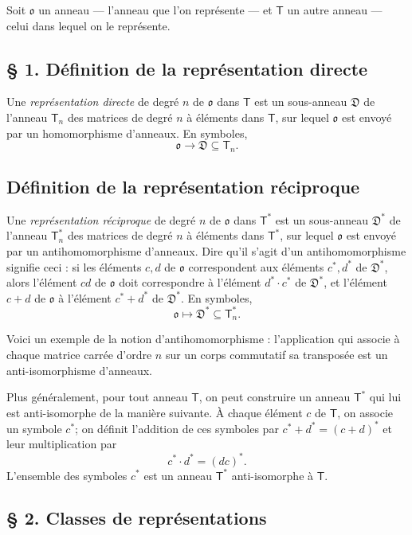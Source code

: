 Soit $\mathfrak{o}$ un anneau --- l'anneau que l'on représente --- et $\mathsf T$ un autre anneau --- celui dans lequel on le représente.

\subsection*{\S{} 1. Définition de la représentation directe}\label{fr-r823-definition-representation-directe}

Une \emph{représentation directe} de degré $n$ de $\mathfrak{o}$ dans $\mathsf T$ est un sous-anneau $\mathfrak D$ de l'anneau $\mathsf T_n$ des matrices de degré $n$ à éléments dans $\mathsf T$, sur lequel $\mathfrak{o}$ est envoyé par un homomorphisme d'anneaux. En symboles,
\[
\mathfrak{o}\to\mathfrak D\subseteq\mathsf T_n.
\]

\subsection*{Définition de la représentation réciproque}\label{fr-r823-definition-representation-reciproque}

Une \emph{représentation réciproque} de degré $n$ de $\mathfrak{o}$ dans $\mathsf T^*$ est un sous-anneau $\mathfrak D^*$ de l'anneau $\mathsf T_n^*$ des matrices de degré $n$ à éléments dans $\mathsf T^*$, sur lequel $\mathfrak{o}$ est envoyé par un antihomomorphisme d'anneaux. Dire qu'il s'agit d'un antihomomorphisme signifie ceci : si les éléments $c,d$ de $\mathfrak{o}$ correspondent aux éléments $c^*,d^*$ de $\mathfrak D^*$, alors l'élément $cd$ de $\mathfrak{o}$ doit correspondre à l'élément $d^*\cdot c^*$ de $\mathfrak D^*$, et l'élément $c+d$ de $\mathfrak{o}$ à l'élément $c^*+d^*$ de $\mathfrak D^*$. En symboles,
\[
\mathfrak{o}\mapsto\mathfrak D^*\subseteq\mathsf T_n^*.
\]

Voici un exemple de la notion d'antihomomorphisme : l'application qui associe à chaque matrice carrée d'ordre $n$ sur un corps commutatif sa transposée est un anti-isomorphisme d'anneaux.

Plus généralement, pour tout anneau $\mathsf T$, on peut construire un anneau $\mathsf T^*$ qui lui est anti-isomorphe de la manière suivante. À chaque élément $c$ de $\mathsf T$, on associe un symbole $c^*$; on définit l'addition de ces symboles par $c^*+d^*=(c+d)^*$ et leur multiplication par
\[
c^*\cdot d^*=(dc)^*.
\]
L'ensemble des symboles $c^*$ est un anneau $\mathsf T^*$ anti-isomorphe à $\mathsf T$.

\subsection*{\S{} 2. Classes de représentations}\label{fr-r823-classes-representations}

